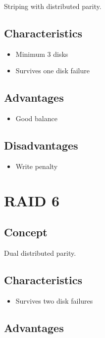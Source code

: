 Striping with distributed parity.

\subsection{Characteristics}

\begin{itemize}
\item Minimum 3 disks
\item Survives one disk failure
\end{itemize}

\subsection{Advantages}

\begin{itemize}
\item Good balance
\end{itemize}

\subsection{Disadvantages}

\begin{itemize}
\item Write penalty
\end{itemize}

\section{RAID 6}

\subsection{Concept}

Dual distributed parity.

\subsection{Characteristics}

\begin{itemize}
\item Survives two disk failures
\end{itemize}

\subsection{Advantages}

